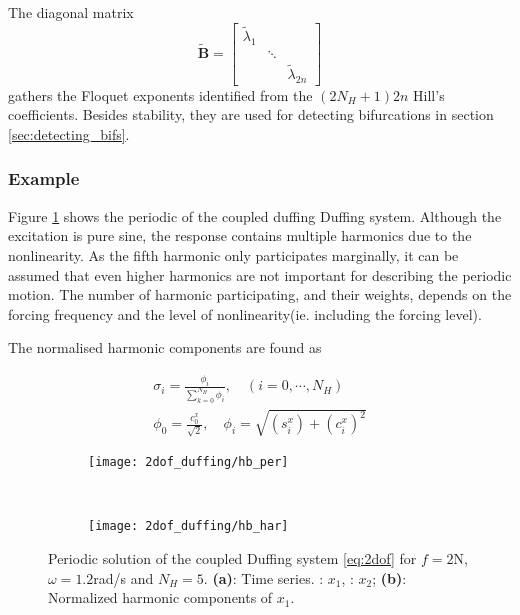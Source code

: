 The diagonal matrix
\begin{equation}
  \label{eq:hb_B_tilde}
  \tilde{\bm B} =
  \begin{bmatrix}
    \tilde \lambda_1 \\
    & \ddots \\
    & & \tilde \lambda_{2n}
  \end{bmatrix}
\end{equation}
gathers the Floquet exponents identified from the $(2 N_H + 1)2n$ Hill's
coefficients. Besides stability, they are used for detecting bifurcations in
section \ref{sec:detecting_bifs}.

\subsubsection{Example}
\label{sec:hb_example}

Figure \ref{fig:hb_duffing_periodic} shows the periodic of the coupled duffing
Duffing system. Although the excitation is pure sine, the response contains
multiple harmonics due to the nonlinearity.
As the fifth harmonic only participates marginally, it can be assumed that
even higher harmonics are not important for describing the periodic motion.
The number of harmonic participating, and their weights, depends on the forcing
frequency and the level of nonlinearity(ie. including the forcing level).

The normalised harmonic components are found as

\begin{equation}
  \label{eq:hb_normal_coeff}
  \begin{aligned}
    \sigma_i = \frac{\phi_i}{\sum_{k=0}^{N_H} \phi_i}, \quad (i=0,\cdots, N_H) \\
    \phi_0 = \frac{c_0^x}{\sqrt{2}}, \quad \phi_i = \sqrt{(s^x_i) + (c^x_i)^2}
  \end{aligned}
\end{equation}


\begin{figure}[!ht]
  \centering
  \begin{subfigure}[b]{0.6\textwidth}
    \texttt{[image: 2dof\_duffing/hb\_per]}
    \caption{}
  \end{subfigure}
  ~
  \begin{subfigure}[b]{0.36\textwidth}
    \texttt{[image: 2dof\_duffing/hb\_har]}
    \caption{}
  \end{subfigure}
  \caption{Periodic solution of the coupled Duffing system \eqref{eq:2dof} for
    $f=2$N,
    $\omega=1.2$rad/s and $N_H=5$.
    \textbf{(a)}: Time series.
    \sampleline{}: $x_1$,
    : $x_2$;
    \textbf{(b)}: Normalized harmonic components of $x_1$.}
  \label{fig:hb_duffing_periodic}
\end{figure}
\FloatBarrier


